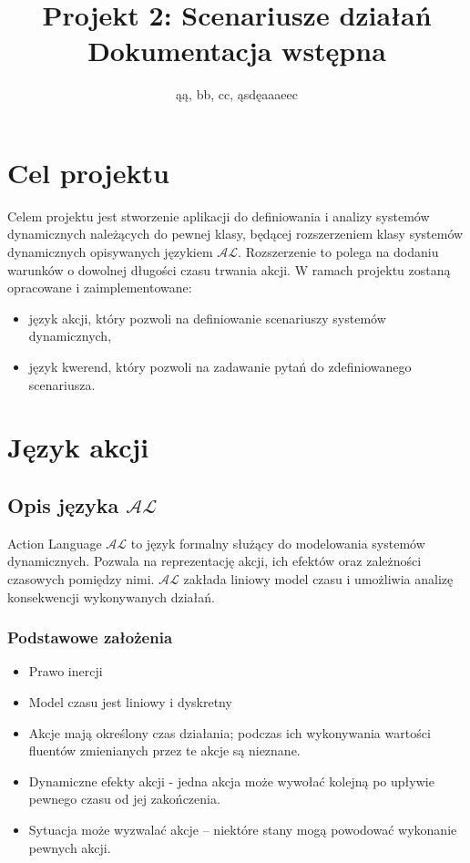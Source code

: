 \documentclass{article}
\title{Projekt 2: Scenariusze działań \\ \large{Dokumentacja wstępna}}
\author{ąą, bb, cc, ąsdęaaaeec}
\begin{document}
\maketitle
\tableofcontents

\newpage

\section{Cel projektu}
Celem projektu jest stworzenie aplikacji do definiowania i analizy systemów dynamicznych należących do pewnej klasy, będącej rozszerzeniem klasy systemów dynamicznych opisywanych językiem $\mathcal{AL}$.
Rozszerzenie to polega na dodaniu warunków o dowolnej długości czasu trwania akcji. W ramach projektu zostaną opracowane i zaimplementowane:
\begin{itemize}
	\item język akcji, który pozwoli na definiowanie scenariuszy systemów dynamicznych,
	\item język kwerend, który pozwoli na zadawanie pytań do zdefiniowanego scenariusza.
\end{itemize}	


\section{Język akcji}

\subsection{Opis języka $\mathcal{AL}$}
\label{sec:opis-jezyka-al}

Action Language $\mathcal{AL}$ to język formalny służący do modelowania systemów dynamicznych. Pozwala na reprezentację akcji, ich efektów oraz zależności czasowych pomiędzy nimi. $\mathcal{AL}$ zakłada liniowy model czasu i umożliwia analizę konsekwencji wykonywanych działań.

\subsubsection{Podstawowe założenia}
\begin{itemize}
    \item Prawo inercji
    \item Model czasu jest liniowy i dyskretny
    \item Akcje mają określony czas działania; podczas ich wykonywania wartości fluentów zmienianych przez te akcje są nieznane.
    \item Dynamiczne efekty akcji - jedna akcja może wywołać kolejną po upływie pewnego czasu od jej zakończenia.
    \item Sytuacja może wyzwalać akcje – niektóre stany mogą powodować wykonanie pewnych akcji.
\end{itemize}
\end{document}
